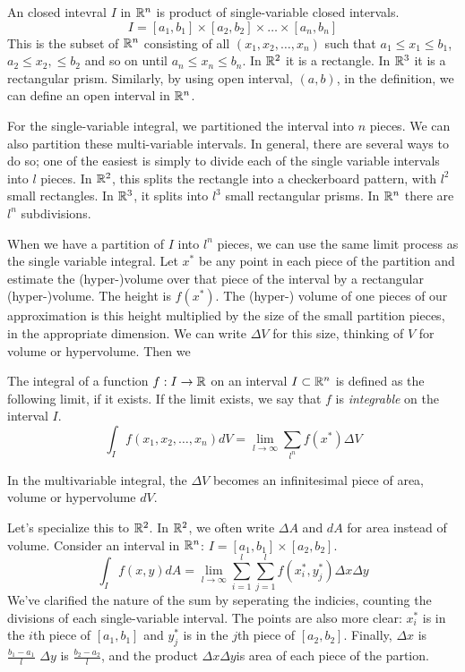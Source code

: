 \documentclass[fleqn,letterpaper]{report}
\begin{document}
\begin{defn}
An closed intevral $I$ in $\mathbb{R}^n$ is product of single-variable
closed intervals.
\begin{equation*}
I = [a_1,b_1] \times [a_2,b_2] \times \ldots \times
[a_n,b_n]
\end{equation*}
This is the subset of $\mathbb{R}^n$ consisting of all $(x_1, x_2,
\ldots, x_n)$ such that $a_1 \leq x_1 \leq b_1$, $a_2 \leq
x_2, \leq b_2$ and so on until $a_n \leq x_n \leq b_n$. In
$\mathbb{R}^2$ it is a rectangle. In $\mathbb{R}^3$ it is a rectangular
prism. Similarly, by using open interval, $(a,b)$, in the
definition, we can define an open interval in
$\mathbb{R}^n$. 
\end{defn}

For the single-variable integral, we partitioned the interval
into $n$ pieces. We can also partition these multi-variable
intervals. In general, there are several ways to do so; one
of the easiest is simply to divide each of the single variable
intervals into $l$ pieces. In $\mathbb{R}^2$, this splits the
rectangle into a checkerboard pattern, with $l^2$ small
rectangles. In $\mathbb{R}^3$, it splits into $l^3$ small
rectangular prisms. In $\mathbb{R}^n$ there are $l^n$ subdivisions.

When we have a partition of $I$ into $l^n$ pieces, we
can use the same limit process as the single variable integral. Let
$x^*$ be any point in each piece of the partition and estimate
the (hyper-)volume over that piece of the interval by a
rectangular (hyper-)volume. The height is $f(x^*)$. The
(hyper-) volume of one pieces of our approximation is this
height multiplied by the size of the small partition pieces,
in the appropriate dimension. We can write $\Delta V$ for
this size, thinking of $V$ for volume or hypervolume. Then we

\begin{defn}
The integral of a function $f:I \rightarrow \mathbb{R}$
on an interval $I \subset \mathbb{R}^n$ is defined as the following
limit, if it exists. If the limit exists, we say that $f$ is
\emph{integrable} on the interval $I$.
\begin{equation*}
\int_{I} f(x_1, x_2, \ldots, x_n) dV = \lim_{l \rightarrow
\infty} \sum_{l^n} f(x^*) \Delta V
\end{equation*}
\end{defn}

In the multivariable integral, the $\Delta V$ becomes an
infinitesimal piece of area, volume or hypervolume $dV$. 

Let's specialize this to $\mathbb{R}^2$. In $\mathbb{R}^2$, we often write
$\Delta A$ and $dA$ for area instead of volume. Consider an
interval in $\mathbb{R}^n$: $I = [a_1,b_1] \times [a_2,b_2]$.
\begin{equation*}
\int_{I} f(x,y) dA = \lim_{l \rightarrow \infty}
\sum_{i=1}^l \sum_{j=1}^l f(x_i^*,y_j^*) \Delta x \Delta y
\end{equation*}
We've clarified the nature of the sum by seperating the
indicies, counting the divisions of each single-variable
interval. The points are also more clear: $x_i^*$ is in the
$i$th piece of $[a_1,b_1]$ and $y_j^*$ is in the $j$th piece
of $[a_2,b_2]$. Finally, $\Delta x$ is $\frac{b_1-a_1}{l}$
$\Delta y$ is $\frac{b_2-a_2}{l}$, and the product $\Delta x
\Delta y$is area of each piece of the partion.
\end{document}
